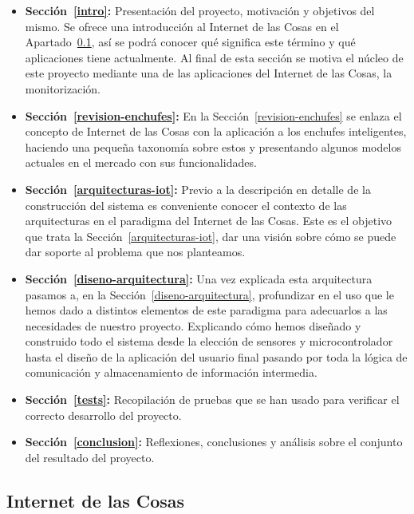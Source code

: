\documentclass[a4paper,10pt]{article}
\begin{document}
\begin{itemize}
\item{\textbf{Sección~\ref{intro}:} Presentación del proyecto,
  motivación y objetivos del mismo. Se ofrece una introducción al
  Internet de las Cosas en el Apartado~\ref{internet-de-las-cosas},
  así se podrá conocer qué significa este término y qué aplicaciones
  tiene actualmente. Al final de esta sección se motiva el núcleo de
  este proyecto mediante una de las aplicaciones del Internet de las
  Cosas, la monitorización.}
  
\item{\textbf{Sección~\ref{revision-enchufes}:} En la
  Sección~\ref{revision-enchufes} se enlaza el concepto de Internet de
  las Cosas con la aplicación a los enchufes inteligentes, haciendo
  una pequeña taxonomía sobre estos y presentando algunos modelos
  actuales en el mercado con sus funcionalidades.}
  
\item{\textbf{Sección~\ref{arquitecturas-iot}:} Previo a la
  descripción en detalle de la construcción del sistema es conveniente
  conocer el contexto de las arquitecturas en el paradigma del
  Internet de las Cosas. Este es el objetivo que trata la
  Sección~\ref{arquitecturas-iot}, dar una visión sobre cómo se puede
  dar soporte al problema que nos planteamos.}
  
\item{\textbf{Sección~\ref{diseno-arquitectura}:} Una vez explicada
  esta arquitectura pasamos a, en la
  Sección~\ref{diseno-arquitectura}, profundizar en el uso que le
  hemos dado a distintos elementos de este paradigma para adecuarlos a
  las necesidades de nuestro proyecto. Explicando cómo hemos diseñado
  y construido todo el sistema desde la elección de sensores y
  microcontrolador hasta el diseño de la aplicación del usuario final
  pasando por toda la lógica de comunicación y almacenamiento de
  información intermedia.}

\item{\textbf{Sección~\ref{tests}:} Recopilación de pruebas que se han usado
  para verificar el correcto desarrollo del proyecto.}

\item{\textbf{Sección~\ref{conclusion}:} Reflexiones, conclusiones y
  análisis sobre el conjunto del resultado del proyecto.}
\end{itemize}

\newpage

\subsection{Internet de las Cosas}\label{internet-de-las-cosas}
\end{document}
